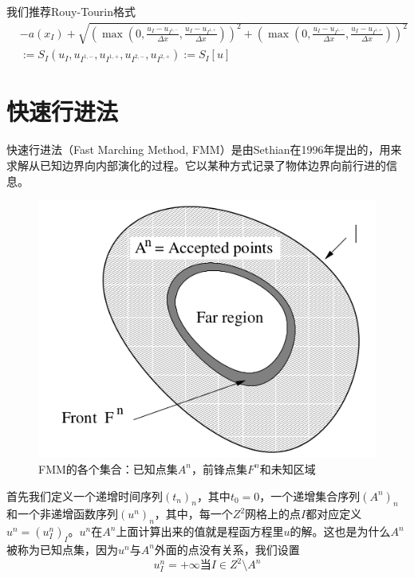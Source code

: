 我们推荐Rouy-Tourin格式
\begin{equation}
    \label{eikonal_equation_3}
    \begin{aligned}
    & -a(x_I) + \sqrt{(\max(0, \frac{u_I - u_{I^{1, -}}}{\Delta x}, \frac{u_I - u_{I^{1, +}}}{\Delta x}))^2 + (\max(0, \frac{u_I - u_{I^{1, -}}}{\Delta x}, \frac{u_I - u_{I^{1, +}}}{\Delta x}))^2} \\
    & := S_I(u_I, u_{I^{1, -}}, u_{I^{1, +}}, u_{I^{2, -}}, u_{I^{2, +}}) := S_I[u]
    \end{aligned}
\end{equation}

\section{快速行进法}
快速行进法（Fast Marching Method, FMM）是由Sethian在1996年提出的，用来求解从已知边界向内部演化的过程。它以某种方式记录了物体边界向前行进的信息。
\begin{figure}[h!]
    \centering
    \includegraphics[width=300bp]{figure/sets_fmm.png}
    \caption{FMM的各个集合：已知点集$A^n$，前锋点集$F^n$和未知区域}
    \label{fig-sets_fmm}
\end{figure}

首先我们定义一个递增时间序列$(t_{n})_{n}$，其中$t_{0} = 0$，一个递增集合序列$(A^{n})_{n}$和一个非递增函数序列$(u^{n})_{n}$，其中，每一个$Z^{2}$网格上的点$I$都对应定义$u^{n} = (u^{n}_{I})_{I}$。$u^n$在$A^n$上面计算出来的值就是程函方程里$u$的解。这也是为什么$A^n$被称为已知点集，因为$u^n$与$A^n$外面的点没有关系，我们设置
\begin{equation*}
    \label{far_region}
    u^n_I = +\infty \mbox{当} I \in Z^2 \setminus A^n
\end{equation*}

